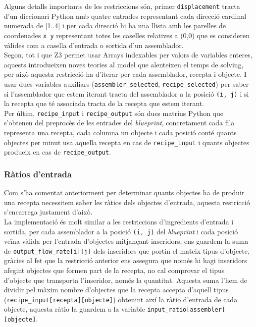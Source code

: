 Alguns detalls importants de les restriccions són, primer \lstinline{displacement} tracta d'un diccionari Python amb quatre entrades representant cada direcció cardinal numerada de [1..4] i per cada direcció hi ha una llista amb les parelles de coordenades \lstinline{x y} representant totes les caselles relatives a (0,0) que es consideren vàlides com a casella d'entrada o sortida d'un assemblador.\\
Segon, tot i que Z3 permet usar Arrays indexables per valors de variables enteres, aquests introdueixen noves teories al model que alenteixen el temps de solving, per això aquesta restricció ha d'iterar per cada assemblador, recepta i objecte. I usar dues variables auxiliars (\lstinline{assembler_selected}, \lstinline{recipe_selected}) per saber si l'assemblador que estem iterant tracta del assemblador a la posició \lstinline{(i, j)} i si la recepta que té associada tracta de la recepta que estem iterant.\\
Per últim, \lstinline{recipe_input} i \lstinline{recipe_output} són dues matrius Python que s'obtenen del preprocès de les entrades del \textit{blueprint}, concretament cada fila representa una recepta, cada columna un objecte i cada posició conté quants objectes per minut usa aquella recepta en cas de \lstinline{recipe_input} i quants objectes produeix en cas de \lstinline{recipe_output}.

\subsubsection{Ràtios d'entrada}
Com s'ha comentat anteriorment per determinar quants objectes ha de produir una recepta necessitem saber les ràtios dels objectes d'entrada, aquesta restricció s'encarrega justament d'això.\\
La implementació és molt similar a les restriccions d'ingredients d'entrada i sortida, per cada assemblador a la posició \lstinline{(i, j)} del \textit{blueprint} i cada posició veïna vàlida per l'entrada d'objectes mitjançant inseridors, ens guardem la suma de \lstinline{output_flow_rate[i][j]} dels inseridors que portin el mateix tipus d'objecte, gràcies al fet que la restricció anterior ens assegura que només hi hagi inseridors afegint objectes que formen part de la recepta, no cal comprovar el tipus d'objecte que transporta l'inseridor, només la quantitat. Aquesta suma l'hem de dividir pel màxim nombre d'objectes que la recepta accepta d'aquell tipus (\lstinline{recipe_input[recepta][objecte]}) obtenint així la ràtio d'entrada de cada objecte, aquesta ràtio la guardem a la variable \lstinline{input_ratio[assembler][objecte]}.

